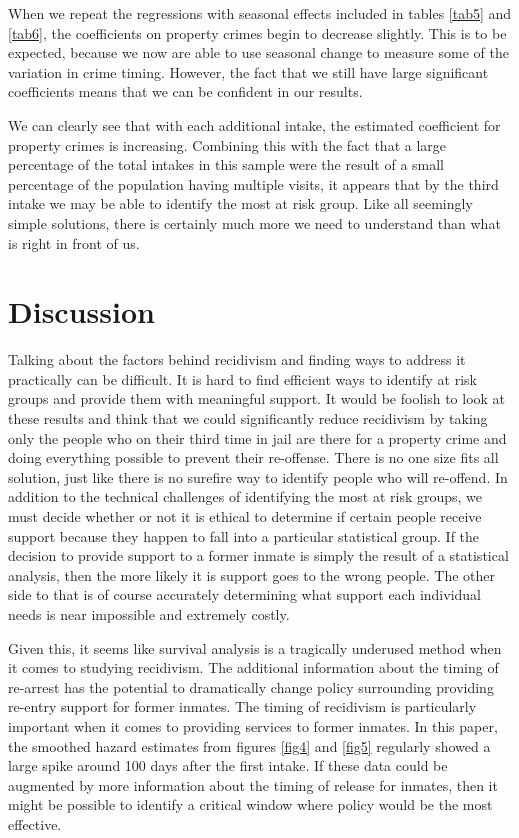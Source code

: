 \documentclass{article}
\begin{document}
When we repeat the regressions with seasonal effects included in tables \ref{tab5} and \ref{tab6}, the coefficients on property crimes begin to decrease slightly. This is to be expected, because we now are able to use seasonal change to measure some of the variation in crime timing. However, the fact that we still have large significant coefficients means that we can be confident in our results. 

We can clearly see that with each additional intake, the estimated coefficient for property crimes is increasing. Combining this with the fact that a large percentage of the total intakes in this sample were the result of a small percentage of the population having multiple visits, it appears that by the third intake we may be able to identify the most at risk group. Like all seemingly simple solutions, there is certainly much more we need to understand than what is right in front of us. 

\section{Discussion}
Talking about the factors behind recidivism and finding ways to address it practically can be difficult. It is hard to find efficient ways to identify at risk groups and provide them with meaningful support. It would be foolish to look at these results and think that we could significantly reduce recidivism by taking only the people who on their third time in jail are there for a property crime and doing everything possible to prevent their re-offense. There is no one size fits all solution, just like there is no surefire way to identify people who will re-offend. In addition to the technical challenges of identifying the most at risk groups, we must decide whether or not it is ethical to determine if certain people receive support because they happen to fall into a particular statistical group. If the decision to provide support to a former inmate is simply the result of a statistical analysis, then the more likely it is support goes to the wrong people. The other side to that is of course accurately determining what support each individual needs is near impossible and extremely costly. 

Given this, it seems like survival analysis is a tragically underused method when it comes to studying recidivism. The additional information about the timing of re-arrest has the potential to dramatically change policy surrounding providing re-entry support for former inmates. The timing of recidivism is particularly important when it comes to providing services to former inmates. In this paper, the smoothed hazard estimates from figures \ref{fig4} and \ref{fig5} regularly showed a large spike around 100 days after the first intake. If these data could be augmented by more information about the timing of release for inmates, then it might be possible to identify a critical window where policy would be the most effective. 
\end{document}
